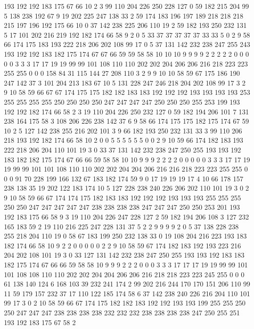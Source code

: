 193 192 192 183 175 67 66 10 2 3 99 110 204 226 250 228 127 0 59 182
215 204 99 5 138 238 192 67 9 19 202 225 247 138 33 2 59 174 183 196
197 189 218 218 218 215 197 196 192 175 66 10 0 37 142 238 225 206 110 19
2 59 182 193 250 232 131 5 17 101 202 216 219 192 182 174 66 58 9 2
0 5 33 37 37 37 37 37 33 33 5 0 2 9 58 66 174 175 183 193
222 218 206 202 108 99 17 0 5 37 131 142 232 238 247 255 243 193 192 192
183 182 175 174 67 67 66 59 59 58 58 10 10 10 9 9 9 9 2 2
2 2 2 0 0 0 0 0 3 3 3 17 17 19 19 99 99 101 108 110
110 202 202 204 206 206 216 218 223 223 255 255 0 0 0 158 84 31 115 144
27 208 110 3 2 9 9 10 10 58 59 67 175 186 190 247 142 37 3 101
204 213 183 67 10 5 131 228 247 246 218 204 202 108 99 17 3 2 9 10
58 59 66 67 67 174 175 175 182 182 183 183 192 192 192 193 193 193 193 253
255 255 255 255 250 250 250 250 247 247 247 247 250 250 250 255 253 199 193 192
192 182 174 66 58 2 3 19 110 204 226 250 232 127 0 59 182 194 206 101
7 131 238 164 175 58 3 108 206 226 238 142 37 6 9 58 66 174 175 175
182 175 174 67 59 10 2 5 127 142 238 255 216 202 101 3 9 66 182 193
250 232 131 33 3 99 110 206 218 193 192 182 174 66 58 10 2 0 0 5
5 5 5 5 5 0 0 2 9 10 59 66 174 182 183 193 222 218 206 204
110 101 19 3 0 33 37 131 142 232 238 247 250 255 193 193 192 183 182 182
175 174 67 66 66 59 58 58 10 10 9 9 9 2 2 2 2 0 0 0
0 0 3 3 3 17 17 19 19 99 99 101 101 108 110 110 202 202 204 204
206 216 216 218 223 223 255 255 0 0 0 91 70 228 199 166 132 67 183 182
174 59 9 0 17 19 19 19 17 4 10 66 178 157 238 138 35 19 202 122
183 174 10 5 127 228 238 240 226 206 202 110 101 19 3 0 2 9 10 58
59 66 67 174 174 175 182 183 183 192 192 192 193 193 193 255 255 255 250 250
247 247 247 247 247 238 238 238 238 247 247 247 250 250 253 201 193 192 183 175
66 58 9 3 19 110 204 226 247 228 127 2 59 182 194 206 108 3 127 232
165 183 59 2 19 110 216 225 247 228 131 37 5 2 2 9 9 9 9 2
0 5 37 138 228 238 255 218 204 110 19 0 58 67 183 199 250 232 138 33
0 19 108 204 216 223 193 183 182 174 66 58 10 9 2 2 0 0 0 0
0 2 2 9 10 58 59 67 174 182 183 192 193 223 216 204 202 108 101 19
3 0 33 127 131 142 232 238 247 250 255 193 193 192 183 183 182 175 174 67
66 66 59 58 58 10 9 9 9 2 2 2 0 0 0 3 3 3 17 17
17 19 19 99 99 101 101 108 108 110 110 202 202 204 204 206 206 216 218 218
223 223 245 255 0 0 0 61 138 140 124 6 168 103 39 232 241 174 2 99
202 216 244 170 170 151 206 110 99 11 59 179 157 232 37 17 110 122 185 174
58 6 37 142 238 240 226 216 204 110 101 99 17 3 0 2 10 58 59 66
67 174 175 182 182 183 192 192 193 193 199 255 255 250 250 247 247 247 238 238
238 238 232 232 232 238 238 238 238 247 250 255 251 193 192 183 175 67 58 2
